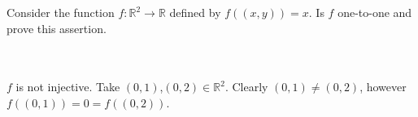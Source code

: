Consider the function $f:\mathbb{R}^2\rightarrow\mathbb{R}$ defined by $f((x,y))=x$. Is $f$ one-to-one
and prove this assertion.\\\\

\begin{solution}\renewcommand{\qedsymbol}{}\ \\
    $f$ is not injective. Take $(0,1)$,$(0,2)\in\mathbb{R}^2$. Clearly $(0,1)\neq(0,2)$, however
    $f((0,1))=0=f((0,2))$.

\end{solution}